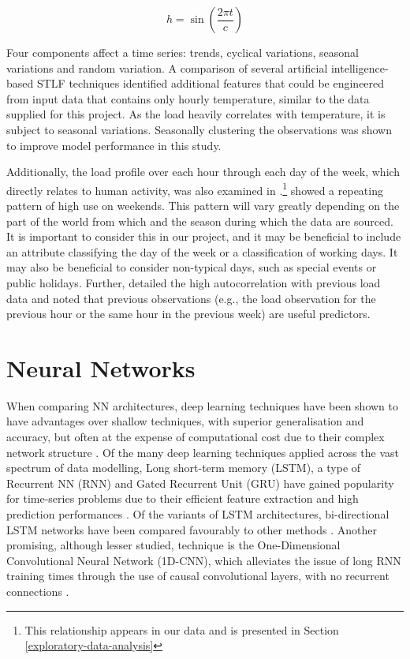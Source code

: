 \documentclass[mstat,12pt]{unswthesis}
\begin{document}
\begin{equation}\label{hour-func}
    h = \sin \left(\frac{2\pi t}{c} \right)
\end{equation}

Four components affect a time series: trends, cyclical variations, seasonal variations and random variation. A comparison of several artificial intelligence-based STLF techniques \cite{Raza2015} identified additional features that could be engineered from input data that contains only hourly temperature, similar to the data supplied for this project. As the load heavily correlates with temperature, it is subject to seasonal variations. Seasonally clustering the observations was shown to improve model performance in this study.

Additionally, the load profile over each hour through each day of the week, which directly relates to human activity, was also examined in \cite{Raza2015}.\footnote{This relationship appears in our data and is presented in Section \ref{exploratory-data-analysis}} \cite{Raza2015} showed a repeating pattern of high use on weekends. This pattern will vary greatly depending on the part of the world from which and the season during which the data are sourced. It is important to consider this in our project, and it may be beneficial to include an attribute classifying the day of the week or a classification of working days. It may also be beneficial to consider non-typical days, such as special events or public holidays. Further, \cite{Raza2015} detailed the high autocorrelation with previous load data and noted that previous observations (e.g., the load observation for the previous hour or the same hour in the previous week) are useful predictors. 

\section{Neural Networks}
When comparing NN architectures, deep learning techniques have been shown to have advantages over shallow techniques, with superior generalisation and accuracy, but often at the expense of computational cost due to their complex network structure \cite{Dong2021}. Of the many deep learning techniques applied across the vast spectrum of data modelling, Long short-term memory (LSTM), a type of Recurrent NN (RNN) and Gated Recurrent Unit (GRU) have gained popularity for time-series problems due to their efficient feature extraction and high prediction performances \cite{Yazici2022}. Of the variants of LSTM architectures, bi-directional LSTM networks have been compared favourably to other methods \cite{Chandra2021}\cite{Wang2019}. Another promising, although lesser studied, technique is the One-Dimensional Convolutional Neural Network (1D-CNN), which alleviates the issue of long RNN training times through the use of causal convolutional layers, with no recurrent connections \cite{Yazici2022}.
\end{document}
